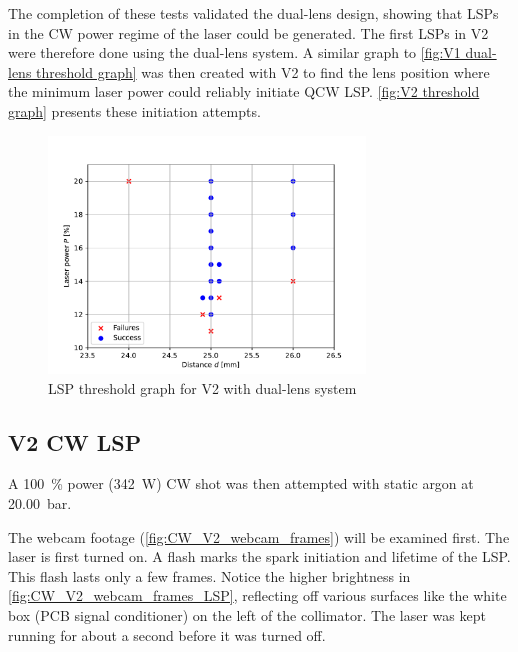             The completion of these tests validated the dual-lens design, showing that LSPs in the CW power regime of the laser could be generated. The first LSPs in V2 were therefore done using the dual-lens system. A similar graph to \autoref{fig:V1 dual-lens threshold graph} was then created with V2 to find the lens position where the minimum laser power could reliably initiate QCW LSP. \autoref{fig:V2 threshold graph} presents these initiation attempts.
            \begin{figure}[!ht]
                \centering
                \includegraphics[width=0.75\textwidth]{assets/4 experiments/V2_focus_threshold.pdf}
                \caption{LSP threshold graph for V2 with dual-lens system}
                \label{fig:V2 threshold graph}
            \end{figure}

        \subsection{V2 CW LSP}

            A \qty{100}{\%} power (\qty{342}{W}) CW shot was then attempted with static argon at \qty{20.00}{bar}. 

            

            The webcam footage (\autoref{fig:CW_V2_webcam_frames}) will be examined first. The laser is first turned on. A flash marks the spark initiation and lifetime of the LSP. This flash lasts only a few frames. Notice the higher brightness in \autoref{fig:CW_V2_webcam_frames_LSP}, reflecting off various surfaces like the white box (PCB signal conditioner) on the left of the collimator. The laser was kept running for about a second before it was turned off.

